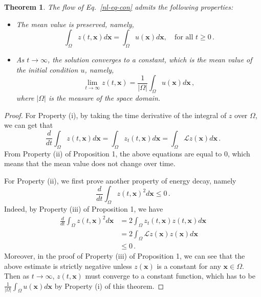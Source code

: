 \documentclass{article}
\newtheorem{theorem}{Theorem}
\newcommand{\xb}{\bm{x}}
\begin{document}
\begin{theorem}
The flow of Eq.~\eqref{nl-eq-con} admits the following properties:
\begin{itemize}
\item[(i)] The mean value is preserved, namely,
\begin{equation}
\int_\Omega z(t,\xb) d\xb = \int_\Omega u(\xb) d\xb,\quad \text{for all } t\ge 0\,.
\end{equation}
\item[(ii)] As $t\to\infty$, the solution converges to a constant, which is the mean value of the initial condition $u$, namely,
\begin{equation}
\lim_{t\to\infty} z(t,\xb) = \frac{1}{|\Omega|} \int_\Omega u(\xb)d\xb\,,
\end{equation}
where $|\Omega|$ is the measure of the space domain.
\end{itemize}
\end{theorem}
\begin{proof}
For Property (i), by taking the time derivative of the integral of $z$ over $\Omega$, we can get that
\[
\frac{d}{dt} \int_\Omega z(t,\xb)d\xb = \int_\Omega z_t(t,\xb) d\xb = \int_\Omega \mathcal{L} z(\xb)d\xb\,.
\]
From Property (ii) of Proposition 1, the above equations are equal to 0, which means that the mean value does not change over time.

For Property (ii), we first prove another property of energy decay, namely
\[
\frac{d}{dt}\int_\Omega z(t,\xb)^2d\xb \le 0\,.
\]
Indeed, by Property (iii) of Proposition 1, we have
\[
\begin{aligned}
\frac{d}{dt}\int_\Omega z(t,\xb)^2d\xb &= 2\int_\Omega z_t(t,\xb) z(t,\xb)d\xb\\
&=2\int_\Omega \mathcal{L} z(\xb) z(\xb)d\xb\\
&\le 0\,.
\end{aligned}
\]
Moreover, in the proof of Property (iii) of Proposition 1, we can see that the above estimate is strictly negative unless  $z(\xb)$ is a constant for any $\xb\in\Omega$. Then as $t\to\infty$, $z(t,\xb)$ must converge to a constant function, which has to be $\frac{1}{|\Omega|}\int_\Omega u(\xb)d\xb$ by Property (i) of this theorem.
\end{proof}
\end{document}
